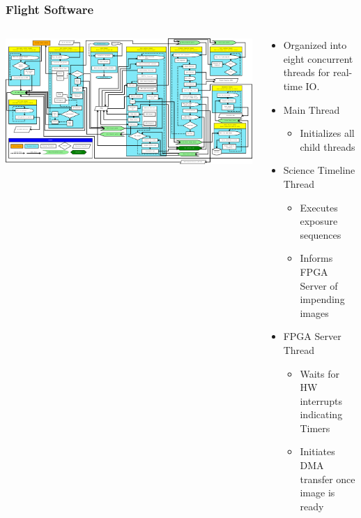 \documentclass[landscape,xcolor={table},10pt]{beamer}
\begin{document}
	\begin{frame}
		
		\frametitle{Flight Software}
		
		\begin{columns}[T] %
		\begin{column}{.60\textwidth}
			\includegraphics[height=0.85\textheight,clip=true,trim=420 20 220 0]{images/mfsw_block}
		\end{column}%
		\hfill%
		\begin{column}{.39\textwidth}
			\leftmargini=10pt
			\begin{itemize}
				\item Organized into eight concurrent threads for real-time IO.
				\item Main Thread
				\begin{itemize}
					\item Initializes all child threads
				\end{itemize}
				\item Science Timeline Thread
				\begin{itemize}
					\item Executes exposure sequences
					\item Informs FPGA Server of impending images
				\end{itemize}
				\item FPGA Server Thread
				\begin{itemize}
					\item Waits for HW interrupts indicating Timers
					\item Initiates DMA transfer once image is ready
				\end{itemize}
			\end{itemize}
					
		\end{column}%
		\end{columns}
		


	\end{frame}
	
\end{document}
